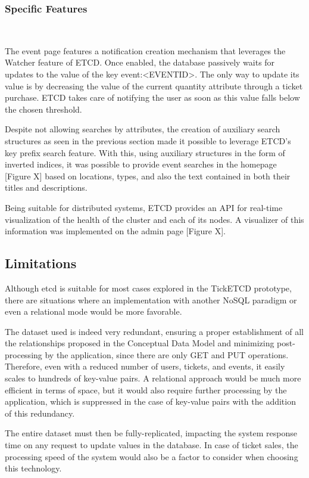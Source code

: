 \documentclass[screen,review]{acmart}
\begin{document}
\subsubsection{Specific Features}~\

The event page features a notification creation mechanism that leverages the Watcher feature of ETCD. Once enabled, the database passively waits for updates to the value of the key event:<EVENTID>. The only way to update its value is by decreasing the value of the current quantity attribute through a ticket purchase. ETCD takes care of notifying the user as soon as this value falls below the chosen threshold.

Despite not allowing searches by attributes, the creation of auxiliary search structures as seen in the previous section made it possible to leverage ETCD's key prefix search feature. With this, using auxiliary structures in the form of inverted indices, it was possible to provide event searches in the homepage [Figure X] based on locations, types, and also the text contained in both their titles and descriptions.

Being suitable for distributed systems, ETCD provides an API for real-time visualization of the health of the cluster and each of its nodes. A visualizer of this information was implemented on the admin page [Figure X].

\subsection{Limitations}
Although etcd is suitable for most cases explored in the TickETCD prototype, there are situations where an implementation with another NoSQL paradigm or even a relational mode would be more favorable.

The dataset used is indeed very redundant, ensuring a proper establishment of all the relationships proposed in the Conceptual Data Model and minimizing post-processing by the application, since there are only GET and PUT operations. Therefore, even with a reduced number of users, tickets, and events, it easily scales to hundreds of key-value pairs. A relational approach would be much more efficient in terms of space, but it would also require further processing by the application, which is suppressed in the case of key-value pairs with the addition of this redundancy.

The entire dataset must then be fully-replicated, impacting the system response time on any request to update values in the database. In case of ticket sales, the processing speed of the system would also be a factor to consider when choosing this technology.
\end{document}
